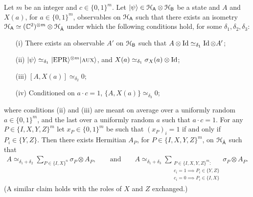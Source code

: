 \begin{lemma}\label{lem:pauli-c-n}
Let $m$ be an integer and $c\in\{0,1\}^m$. Let $|\psi\rangle \in \mathcal{H}_{{\textsf{A}}} \otimes \mathcal{H}_{{\textsf{B}}}$ be a state and $A$ and $X(a)$, for $a\in\{0,1\}^m$, observables on $\mathcal{H}_{{\textsf{A}}}$ such that there exists an isometry $\mathcal{H}_{{\textsf{A}}} \simeq ({\mathbb C}^2)^{\otimes m}\otimes \mathcal{H}_{\hat{{\textsf{A}}}}$ under which the following conditions hold, for some $\delta_1,\delta_2,\delta_3$:
\begin{enumerate}
\item[(i)] There exists an observable $A'$ on $\mathcal{H}_{\textsf{B}}$ such that $A\otimes \mathop{\rm Id}\nolimits \simeq_{\delta_1} \mathop{\rm Id}\nolimits \otimes A'$;
\item[(ii)] $|\psi\rangle \simeq_{\delta_1} |{\rm EPR}\rangle^{\otimes m}|\textsc {aux}\rangle$, and $X(a)\simeq_{\delta_1} \sigma_X(a) \otimes \mathop{\rm Id}\nolimits$;
\item[(iii)] $[A,X(a)]\simeq_{\delta_2} 0$;
\item[(iv)] Conditioned on $a\cdot c=1$, $\{A,X(a)\} \simeq_{\delta_3} 0$;
\end{enumerate}
where conditions (ii) and (iii) are meant on average over a uniformly random
  $a\in\{0,1\}^m$, and the last over a uniformly random $a$ such that $a\cdot c
  =1$. For any $P\in\{I,X,Y,Z\}^m$ let $x_P \in\{0,1\}^m$ be such that $(x_P)_i=1$ if and only if $P_i\in\{Y,Z\}$.
Then there exists Hermitian $A_P$, for $P\in\{I,X,Y,Z\}^m$, on $\mathcal{H}_{\hat{{\textsf{A}}}}$ such that 
\begin{align}
A \simeq_{\delta_1+\delta_2} \sum_{P\in\{I,X\}^n} \sigma_P \otimes A_P,\qquad\text{and}\qquad A \simeq_{\delta_1+\delta_3} \sum_{\substack{P\in\{I,X,Y,Z\}^m:\\ c_i=1 \implies P_i \in \{Y,Z\}\\  c_i=0 \implies P_i \in \{I,X\}}} \sigma_P \otimes A_P.\label{eq:la6}
\end{align}
 (A similar claim holds with the roles of $X$ and $Z$ exchanged.)
\end{lemma}

